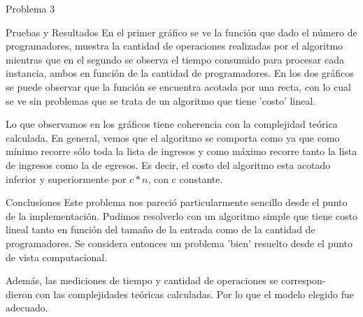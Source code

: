 \begin{section}{Problema 3}
\begin{subsection}{Pruebas y Resultados}
	En el primer gráfico se ve la función que dado el número de programadores, muestra la cantidad de operaciones realizadas por el algoritmo mientras que en el segundo se observa el tiempo consumido para procesar cada instancia, ambos en función de la cantidad de programadores.
	En los dos gráficos se puede observar que la función se encuentra acotada por una recta, con lo cual se ve sin problemas que se trata de un algoritmo que tiene 'costo' lineal.

	Lo que observamos en los gráficos tiene coherencia con la complejidad teórica calculada. 
	En general, vemos que el algoritmo se comporta como  ya que como mínimo recorre sólo toda la lista de ingresos y como máximo recorre tanto la lista de ingresos como la de egresos. Es decir, el costo del algoritmo esta acotado inferior y superiormente por $c*n$, con c constante.
	\end{subsection}
	\begin{subsection}{Conclusiones}
		Este problema nos pareció particularmente sencillo desde el punto de la implementación. Pudimos resolverlo con un algoritmo simple que tiene costo lineal tanto en función del tamaño de la entrada como de la cantidad de programadores. Se considera entonces un problema 'bien' resuelto desde el punto de vista computacional.

		Además, las mediciones de tiempo y cantidad de operaciones se correspon-\\dieron con las complejidades teóricas calculadas. Por lo que el modelo elegido fue adecuado.
	\end{subsection}
\end{section}







